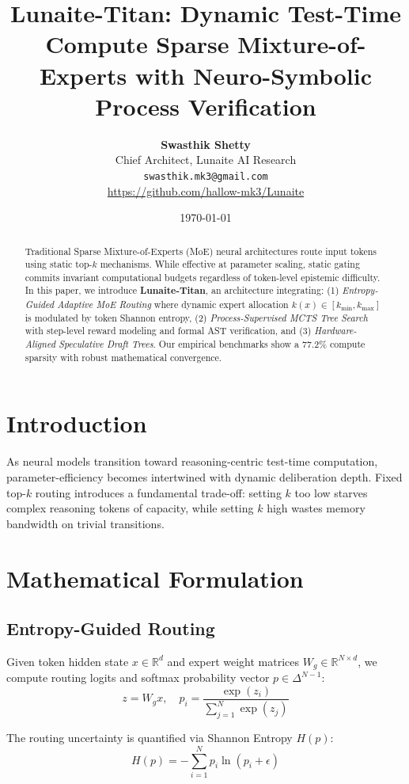 \documentclass[10pt,twocolumn,letterpaper]{article}
\title{\textbf{Lunaite-Titan: Dynamic Test-Time Compute Sparse Mixture-of-Experts with Neuro-Symbolic Process Verification}}
\author{
  \textbf{Swasthik Shetty}\\
  Chief Architect, Lunaite AI Research\\
  \texttt{swasthik.mk3@gmail.com} \\
  \url{https://github.com/hallow-mk3/Lunaite}
}
\date{\today}
\begin{document}
\maketitle

\begin{abstract}
Traditional Sparse Mixture-of-Experts (MoE) neural architectures route input tokens using static top-$k$ mechanisms. While effective at parameter scaling, static gating commits invariant computational budgets regardless of token-level epistemic difficulty. In this paper, we introduce \textbf{Lunaite-Titan}, an architecture integrating: (1) \textit{Entropy-Guided Adaptive MoE Routing} where dynamic expert allocation $k(x) \in [k_{\min}, k_{\max}]$ is modulated by token Shannon entropy, (2) \textit{Process-Supervised MCTS Tree Search} with step-level reward modeling and formal AST verification, and (3) \textit{Hardware-Aligned Speculative Draft Trees}. Our empirical benchmarks show a 77.2\% compute sparsity with robust mathematical convergence.
\end{abstract}

\section{Introduction}
As neural models transition toward reasoning-centric test-time computation, parameter-efficiency becomes intertwined with dynamic deliberation depth. Fixed top-$k$ routing introduces a fundamental trade-off: setting $k$ too low starves complex reasoning tokens of capacity, while setting $k$ high wastes memory bandwidth on trivial transitions.

\section{Mathematical Formulation}

\subsection{Entropy-Guided Routing}
Given token hidden state $x \in \mathbb{R}^d$ and expert weight matrices $W_g \in \mathbb{R}^{N \times d}$, we compute routing logits and softmax probability vector $p \in \Delta^{N-1}$:
\begin{equation}
z = W_g x, \quad p_i = \frac{\exp(z_i)}{\sum_{j=1}^N \exp(z_j)}
\end{equation}

The routing uncertainty is quantified via Shannon Entropy $H(p)$:
\begin{equation}
H(p) = -\sum_{i=1}^N p_i \ln(p_i + \epsilon)
\end{equation}
\end{document}
